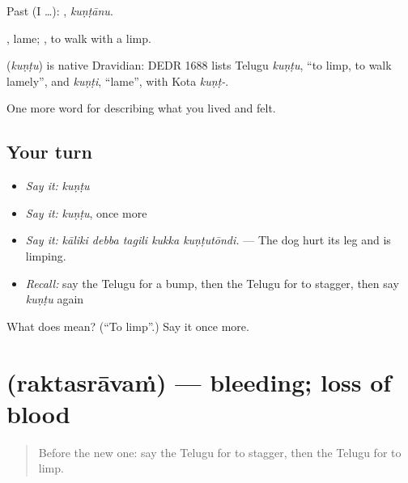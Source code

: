 Past (I …): , \emph{kuṇṭānu}.

, lame;  , to walk with a limp.

\begin{cousinweb}
\textbf{} (\emph{kuṇṭu}) is native Dravidian: DEDR 1688 lists Telugu \emph{kuṇṭu}, \textquotedblleft{}to limp, to walk lamely\textquotedblright{}, and \emph{kuṇṭi}, \textquotedblleft{}lame\textquotedblright{}, with Kota \emph{kuṇṭ-}.
\end{cousinweb}

\begin{grammarlens}[title={What you've built}]
One more word for describing what you lived and felt.
\end{grammarlens}

\subsection*{Your turn}
\begin{itemize}
\raggedright
  \item \emph{Say it:} \emph{kuṇṭu}
  \item \emph{Say it:} \emph{kuṇṭu}, once more
  \item \emph{Say it:} \emph{kāliki debba tagili kukka kuṇṭutōndi.} — The dog hurt its leg and is limping.
  \item \emph{Recall:} say the Telugu for a bump, then the Telugu for to stagger, then say \emph{kuṇṭu} again
\end{itemize}

\begin{tcolorbox}[breakable,colback=teal!4,colframe=teal!35!black,title={Before you move on}]
What does  mean? (\textquotedblleft{}To limp\textquotedblright{}.) Say it once more.
\end{tcolorbox}
\section[\texorpdfstring{\te{రక్తస్రావం} (raktasrāvaṁ)}{రక్తస్రావం (raktasrāvaṁ)}]{ (raktasrāvaṁ) — bleeding; loss of blood}

\label{lesson:TE-C518-raktasravam}



\begin{quote}
Before the new one: say the Telugu for to stagger, then the Telugu for to limp.
\end{quote}

